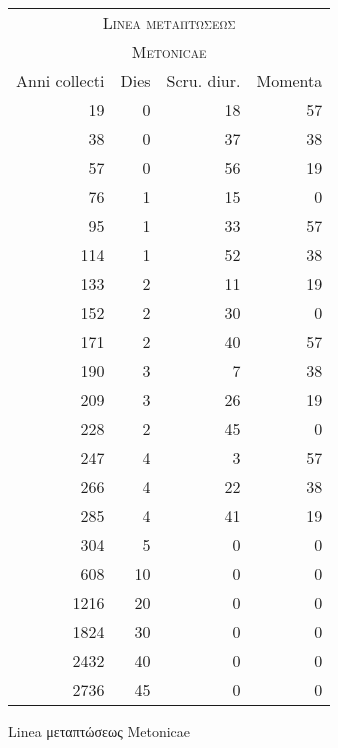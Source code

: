 %
\begin{tabnums} %
\normalsize
\centering
\begin{tabular}{@{}r r r r@{}}
\toprule
\multicolumn{4}{c}{\Large\textsc{Linea \textgreek{μεταπτώσεως}}}\\
\multicolumn{4}{c}{\Large\textsc{Metonicae}}\\
\toprule
Anni collecti &
Dies &
Scru. diur. & %
Momenta
\\
\midrule
  19 &  0 & 18 & 57 \\
  38 &  0 & 37 & 38 \\
  57 &  0 & 56 & 19 \\
  76 &  1 & 15 &  0 \\
  95 &  1 & 33 & 57 \\
 114 &  1 & 52 & 38 \\
 133 &  2 & 11 & 19 \\
 152 &  2 & 30 &  0 \\
 171 &  2 & 40 & 57 \\
 190 &  3 &  7 & 38 \\
 209 &  3 & 26 & 19 \\
 228 &  2 & 45 &  0 \\
 247 &  4 &  3 & 57 \\
 266 &  4 & 22 & 38 \\
 285 &  4 & 41 & 19 \\
 304 &  5 &  0 &  0 \\
\midrule
 608 & 10 &  0 &  0 \\
1216 & 20 &  0 &  0 \\
1824 & 30 &  0 &  0 \\
2432 & 40 &  0 &  0 \\
2736 & 45 &  0 &  0 \\
\bottomrule
\end{tabular}
%
\caption{Linea \textgreek{μεταπτώσεως} Metonicae}
\label{tab:p82}
\end{tabnums}
